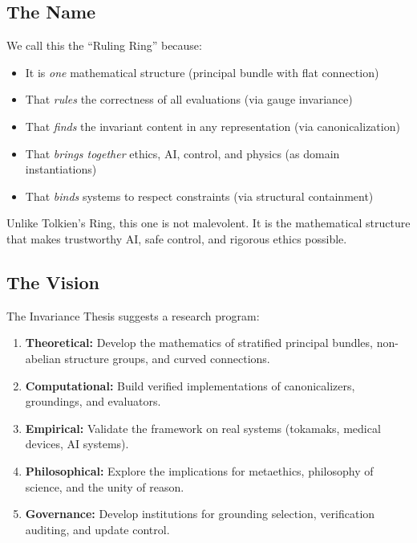 \documentclass[12pt]{article}
\begin{document}
\subsection{The Name}

We call this the ``Ruling Ring'' because:

\begin{itemize}
    \item It is \textit{one} mathematical structure (principal bundle with flat connection)
    \item That \textit{rules} the correctness of all evaluations (via gauge invariance)
    \item That \textit{finds} the invariant content in any representation (via canonicalization)
    \item That \textit{brings together} ethics, AI, control, and physics (as domain instantiations)
    \item That \textit{binds} systems to respect constraints (via structural containment)
\end{itemize}

Unlike Tolkien's Ring, this one is not malevolent. It is the mathematical structure that makes trustworthy AI, safe control, and rigorous ethics possible.

\subsection{The Vision}

The Invariance Thesis suggests a research program:

\begin{enumerate}
    \item \textbf{Theoretical:} Develop the mathematics of stratified principal bundles, non-abelian structure groups, and curved connections.

    \item \textbf{Computational:} Build verified implementations of canonicalizers, groundings, and evaluators.

    \item \textbf{Empirical:} Validate the framework on real systems (tokamaks, medical devices, AI systems).

    \item \textbf{Philosophical:} Explore the implications for metaethics, philosophy of science, and the unity of reason.

    \item \textbf{Governance:} Develop institutions for grounding selection, verification auditing, and update control.
\end{enumerate}
\end{document}
